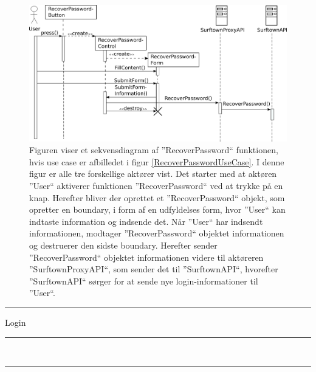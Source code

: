 \documentclass[12pt]{article}
\begin{document}
\begin{figure}[!h]
	\centering
	\includegraphics[width=13cm]{sekvens_diagrammer/recoverPassword.png}
	\caption{Figuren viser et sekvensdiagram af ''RecoverPassword`` funktionen, hvis use case er afbilledet i figur \ref{RecoverPasswordUseCase}. I denne figur er alle tre forskellige aktører vist. Det starter med at aktøren ''User`` aktiverer funktionen ''RecoverPassword`` ved at trykke på en knap. Herefter bliver der oprettet et ''RecoverPassword`` objekt, som opretter en boundary, i form af en udfyldelses form, hvor ''User`` kan indtaste information og indsende det. Når ''User`` har indsendt informationen, modtager ''RecoverPassword`` objektet informationen og destruerer den sidste boundary. Herefter sender ''RecoverPassword`` objektet informationen  videre til aktøreren ''SurftownProxyAPI``, som sender det til ''SurftownAPI``, hvorefter ''SurftownAPI`` sørger for at sende nye login-informationer til ''User``.}
	\label{fig:RecoverPassword}
\end{figure}
\newpage
	\hspace{-20pt}
	\rule{430pt}{1.0pt}
	 Login\\
	\rule{430pt}{0.4pt}
	\\
	\rule{430pt}{0.4pt}
\end{document}
